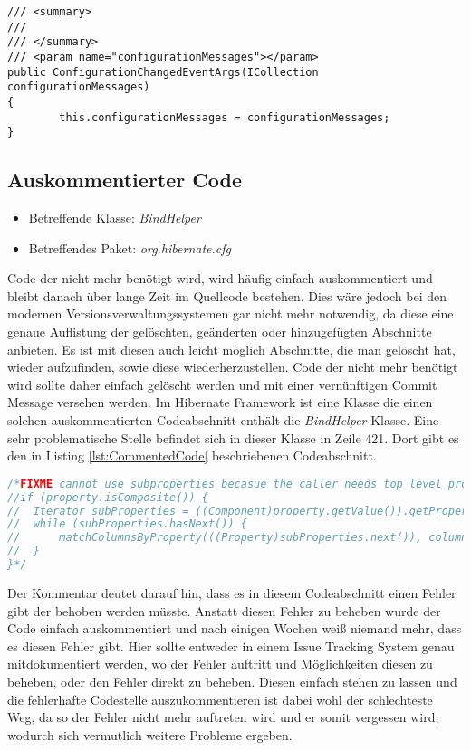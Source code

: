 \begin{lstlisting}[language={[Sharp]C}, caption=Beispiele für überflüssige Kommentare, label=lst:RedundantComment]
/// <summary>
/// 
/// </summary>
/// <param name="configurationMessages"></param>
public ConfigurationChangedEventArgs(ICollection configurationMessages)
{
		this.configurationMessages = configurationMessages;
}
\end{lstlisting}

\subsection{Auskommentierter Code}
\begin{itemize}
	\item Betreffende Klasse: \textit{BindHelper}
	\item Betreffendes Paket: \textit{org.hibernate.cfg}
\end{itemize}


\SuperPar Code der nicht mehr benötigt wird, wird häufig einfach auskommentiert und bleibt danach über lange Zeit im Quellcode bestehen. Dies wäre jedoch bei den modernen Versionsverwaltungssystemen gar nicht mehr notwendig, da diese eine genaue Auflistung der gelöschten, geänderten oder hinzugefügten Abschnitte anbieten. Es ist mit diesen auch leicht möglich Abschnitte, die man gelöscht hat, wieder aufzufinden, sowie diese wiederherzustellen. Code der nicht mehr benötigt wird sollte daher einfach gelöscht werden und mit einer vernünftigen Commit Message versehen werden. Im Hibernate Framework ist eine Klasse die einen solchen auskommentierten Codeabschnitt enthält die \textit{BindHelper} Klasse. Eine sehr problematische Stelle befindet sich in dieser Klasse in Zeile 421. Dort gibt es den in Listing \ref{lst:CommentedCode} beschriebenen Codeabschnitt.

\begin{lstlisting}[language=Java, caption=Beispiele für die Verwendung von \textit{GetByPredicate}, label=lst:CommentedCode]
/*FIXME cannot use subproperties becasue the caller needs top level properties
//if (property.isComposite()) {
//	Iterator subProperties = ((Component)property.getValue()).getPropertyIterator();
// 	while (subProperties.hasNext()) {
//  	matchColumnsByProperty(((Property)subProperties.next()), columnsToProperty);
// 	}
}*/ 
\end{lstlisting}

Der Kommentar deutet darauf hin, dass es in diesem Codeabschnitt einen Fehler gibt der behoben werden müsste. Anstatt diesen Fehler zu beheben wurde der Code einfach auskommentiert und nach einigen Wochen weiß niemand mehr, dass es diesen Fehler gibt. Hier sollte entweder in einem Issue Tracking System genau mitdokumentiert werden, wo der Fehler auftritt und Möglichkeiten diesen zu beheben, oder den Fehler direkt zu beheben. Diesen einfach stehen zu lassen und die fehlerhafte Codestelle auszukommentieren ist dabei wohl der schlechteste Weg, da so der Fehler nicht mehr auftreten wird und er somit vergessen wird, wodurch sich vermutlich weitere Probleme ergeben.
